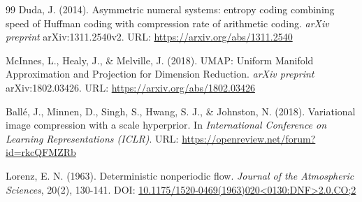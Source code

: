 \documentclass[11pt,a4paper]{article}
\begin{document}
\begin{thebibliography}{99}
Duda, J. (2014).
Asymmetric numeral systems: entropy coding combining speed of Huffman coding with compression rate of arithmetic coding.
\textit{arXiv preprint} arXiv:1311.2540v2.
URL: \href{https://arxiv.org/abs/1311.2540}{https://arxiv.org/abs/1311.2540}

McInnes, L., Healy, J., \& Melville, J. (2018).
UMAP: Uniform Manifold Approximation and Projection for Dimension Reduction.
\textit{arXiv preprint} arXiv:1802.03426.
URL: \href{https://arxiv.org/abs/1802.03426}{https://arxiv.org/abs/1802.03426}

Ball\'e, J., Minnen, D., Singh, S., Hwang, S. J., \& Johnston, N. (2018).
Variational image compression with a scale hyperprior.
In \textit{International Conference on Learning Representations (ICLR)}.
URL: \href{https://openreview.net/forum?id=rkcQFMZRb}{https://openreview.net/forum?id=rkcQFMZRb}

Lorenz, E. N. (1963).
Deterministic nonperiodic flow.
\textit{Journal of the Atmospheric Sciences}, 20(2), 130-141.
DOI: \href{https://doi.org/10.1175/1520-0469(1963)020<0130:DNF>2.0.CO;2}{10.1175/1520-0469(1963)020<0130:DNF>2.0.CO;2}

\end{thebibliography}
\end{document}

